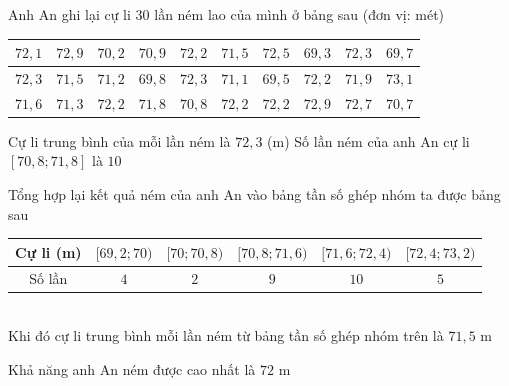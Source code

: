 \begin{ex}%
	Anh An ghi lại cự li $ 30 $ lần ném lao của mình  ở bảng sau (đơn vị: mét)
	\begin{center}
		\begin{tabular}{|c|c|c|c|c|c|c|c|c|c|}
			 \hline
			$ 72{,}1 $ & $ 72{,}9 $ & $ 70{,}2 $ & $ 70{,}9 $ & $ 72{,}2 $ & $ 71{,}5 $ & $ 72{,}5 $ & $ 69{,}3 $ &  $ 72{,}3 $ & $ 69{,}7 $ \\ \hline
			$ 72{,}3 $ & $ 71{,}5 $ & $ 71{,}2 $ & $ 69{,}8 $ & $ 72{,}3 $ & $ 71{,}1  $ & $ 69{,}5 $ & $ 72{,}2 $ & $ 71{,}9 $ & $ 73{,}1 $ \\ \hline
			$ 71{,}6 $ & $ 71{,}3 $ & $ 72{,}2 $ & $ 71{,}8 $ & $ 70{,}8 $ & $ 72{,}2 $  & $ 72{,}2 $ & $ 72{,}9 $ & $ 72{,}7 $ & $ 70{,}7 $ \\ \hline
		\end{tabular}
	\end{center}
	\choiceTF 
		{Cự li trung bình của mỗi  lần ném là $ 72{,}3 $ (m)}
		{\True Số lần ném của anh An cự li $ [70{,}8;71{,}8] $ là $ 10  $}
		{\True Tổng hợp lại kết quả ném của anh An vào bảng tần số ghép nhóm ta được  bảng sau
		\begin{tabular}{|c|c|c|c|c|c|}
			 \hline
			Cự li (m) & $[69{,}2;70)$  & $[70;70{,}8)$ & $[70{,}8;71{,}6)$ & $[71{,}6;72{,}4)$& $[72{,}4;73{,}2)$ \\
			 \hline
			Số lần & $ 4 $ & $ 2  $ & $ 9 $ & $ 10 $ & $ 5 $ \\
			 \hline
	\end{tabular}\\
	Khi đó cự li trung bình mỗi lần ném từ bảng tần số ghép nhóm trên là  $ 71{,}5 $ m}
	{Khả năng anh An ném được cao nhất là  $ 72 $ m}
\end{ex}

